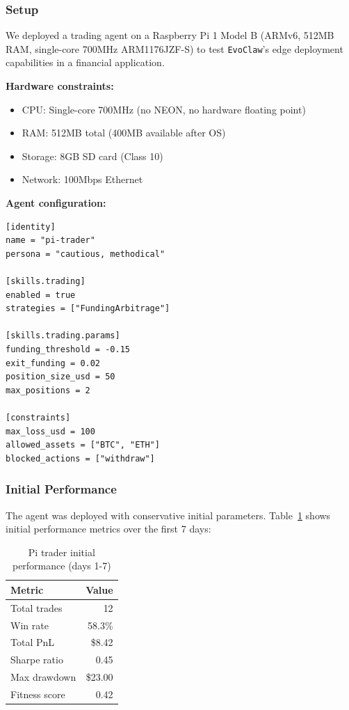 \documentclass{article}
\newcommand{\evoclaw}{\texttt{EvoClaw}\xspace}
\begin{document}
\subsubsection{Setup}

We deployed a trading agent on a Raspberry Pi 1 Model B (ARMv6, 512MB RAM, single-core 700MHz ARM1176JZF-S) to test \evoclaw{}'s edge deployment capabilities in a financial application.

\textbf{Hardware constraints:}
\begin{itemize}[leftmargin=*]
    \item CPU: Single-core 700MHz (no NEON, no hardware floating point)
    \item RAM: 512MB total (400MB available after OS)
    \item Storage: 8GB SD card (Class 10)
    \item Network: 100Mbps Ethernet
\end{itemize}

\textbf{Agent configuration:}
\begin{lstlisting}[style=tomlcode]
[identity]
name = "pi-trader"
persona = "cautious, methodical"

[skills.trading]
enabled = true
strategies = ["FundingArbitrage"]

[skills.trading.params]
funding_threshold = -0.15
exit_funding = 0.02
position_size_usd = 50
max_positions = 2

[constraints]
max_loss_usd = 100
allowed_assets = ["BTC", "ETH"]
blocked_actions = ["withdraw"]
\end{lstlisting}

\subsubsection{Initial Performance}

The agent was deployed with conservative initial parameters. Table~\ref{tab:pi_initial} shows initial performance metrics over the first 7 days:

\begin{table}[h]
\centering
\caption{Pi trader initial performance (days 1-7)}
\label{tab:pi_initial}
\begin{tabular}{lr}
\toprule
\textbf{Metric} & \textbf{Value} \\
\midrule
Total trades & 12 \\
Win rate & 58.3\% \\
Total PnL & \$8.42 \\
Sharpe ratio & 0.45 \\
Max drawdown & \$23.00 \\
Fitness score & 0.42 \\
\bottomrule
\end{tabular}
\end{table}
\end{document}

